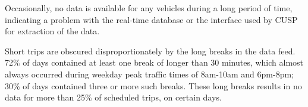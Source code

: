 \documentclass[12pt,journal,compsoc]{IEEEtran}
\begin{document}
\vspace{0.5 cm}

Occasionally, no data is available for any vehicles during a long period of time, indicating a problem with the real-time database or the interface used by CUSP for extraction of the data.

Short trips are obscured disproportionately by the long breaks in the data feed.  72$\%$ of days contained at least one break of longer than 30 minutes, which almost always occurred during weekday peak traffic times of 8am-10am and 6pm-8pm; 30$\%$ of days contained three or more such breaks.   These long breaks results in no data for more than 25$\%$ of scheduled trips, on certain days.
\end{document}
